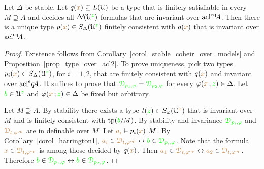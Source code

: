 \begin{theorem}[ (Stationarity)]\label{thm_stationarity}
  Let $\Delta$ be stable.
  Let $q({\color{brown} x})\subseteq L(\EuScript U)$ be a type that is finitely satisfiable in every $M\supseteq A$ and decides all $\BDelta(\U^{\gr z})$-formulas that are invariant over ${\rm acl}^{{\rm eq}}\!A$.
  Then there is a unique type $p({\color{brown} x})\in S_\Delta(\EuScript U^{\color{green} z})$ finitely consistent with $q({\color{brown} x})$ that is invariant over ${\rm acl}^{{\rm eq}}\!A$.
\end{theorem}

\begin{proof}
  Existence follows from Corollary~\ref{corol_stable_coheir_over_models} and Proposition~\ref{prop_type_over_acl2}.
  To prove uniqueness, pick two types $p_i({\color{brown} x})\in S_\Delta(\EuScript U^{\color{green} z})$, for $i=1,2$, that are finitely consistent with $q({\color{brown} x})$ and invariant over ${\rm acl}^eq\!A$.
  It suffices to prove that ${\color{green}\EuScript D_{p_1,\varphi}}={\color{green}\EuScript D_{p_2,\varphi}}$ for every $\varphi({\color{brown} x}\,;{\color{green} z})\in\Delta$.
  Let ${\color{green} b}\in\EuScript U^{\color{green} z}$ and $\varphi({\color{brown} x}\,;{\color{green} z})\in\Delta$ be fixed but arbitrary.

  Let $M\supseteq A$.
  By stability there exists a type $t({\color{green} z})\in S_\varphi(\EuScript U^{\color{brown} x})$ that is invariant over $M$ and is finitely consistent with ${\rm tp}({\color{green} b}/M)$.
  By stability and invariance ${\color{green}\EuScript D_{p_i,\varphi}}$ and ${\color{brown}\EuScript D_{t,\varphi^{\rm op}}}$ are in definable over $M$.
  Let ${\color{brown} a_i}\vDash p_i({\color{brown} x}){\restriction}M$.
  By Corollary~\ref{corol_harrington1}, ${\color{brown} a_i}\in{\color{brown}\EuScript D_{t,\varphi^{\rm op}}}\leftrightarrow{\color{green}b}\in{\color{green}\EuScript D_{p_i,\varphi}}$.
  Note that the formula ${\color{brown} x}\in{\color{brown}\EuScript D_{t,\varphi^{\rm op}}}$ is among those decided by $q({\color{brown} x})$.
  Then ${\color{brown} a_1}\in{\color{brown}\EuScript D_{t,\varphi^{\rm op}}}\leftrightarrow{\color{brown}a_2}\in{\color{brown}\EuScript D_{t,\varphi^{\rm op}}}$.
  Therefore ${\color{green} b}\in{\color{green}\EuScript D_{p_1,\varphi}}\leftrightarrow{\color{green}b}\in{\color{green}\EuScript D_{p_2,\varphi}}$.
\end{proof}



